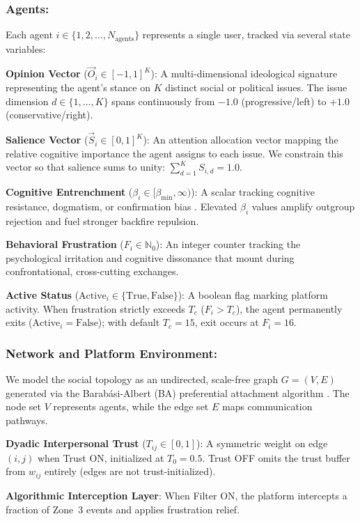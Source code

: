 \subsubsection{Agents:} Each agent $i \in \{1, 2, \dots, N_{\text{agents}}\}$ represents a single user, tracked via several state variables:
\begin{itemize*}
    \item \textbf{Opinion Vector} ($\vec{O}_i \in [-1, 1]^K$): A multi-dimensional ideological signature representing the agent's stance on $K$ distinct social or political issues. The issue dimension $d \in \{1, \dots, K\}$ spans continuously from $-1.0$ (progressive/left) to $+1.0$ (conservative/right).
    \item \textbf{Salience Vector} ($\vec{S}_i \in [0, 1]^K$): An attention allocation vector mapping the relative cognitive importance the agent assigns to each issue. We constrain this vector so that salience sums to unity: $\sum_{d=1}^K S_{i,d} = 1.0$.
    \item \textbf{Cognitive Entrenchment} ($\beta_i \in [\beta_{\min}, \infty)$): A scalar tracking cognitive resistance, dogmatism, or confirmation bias \citep{Chen2021}. Elevated $\beta_i$ values amplify outgroup rejection and fuel stronger backfire repulsion.
    \item \textbf{Behavioral Frustration} ($F_i \in \mathbb{N}_0$): An integer counter tracking the psychological irritation and cognitive dissonance that mount during confrontational, cross-cutting exchanges.
    \item \textbf{Active Status} ($\text{Active}_i \in \{\text{True}, \text{False}\}$): A boolean flag marking platform activity. When frustration strictly exceeds $T_c$ ($F_i > T_c$), the agent permanently exits ($\text{Active}_i = \text{False}$); with default $T_c=15$, exit occurs at $F_i=16$.
\end{itemize*}

\subsubsection{Network and Platform Environment:} We model the social topology as an undirected, scale-free graph $G = (V, E)$ generated via the Barab\'{a}si-Albert (BA) preferential attachment algorithm \citep{Barabasi1999}. The node set $V$ represents agents, while the edge set $E$ maps communication pathways.
\begin{itemize*}
    \item \textbf{Dyadic Interpersonal Trust} ($T_{ij} \in [0, 1]$): A symmetric weight on edge $(i, j)$ when Trust ON, initialized at $T_0=0.5$. Trust OFF omits the trust buffer from $w_{ij}$ entirely (edges are not trust-initialized).
    \item \textbf{Algorithmic Interception Layer}: When Filter ON, the platform intercepts a fraction of Zone~3 events and applies frustration relief.
\end{itemize*}

